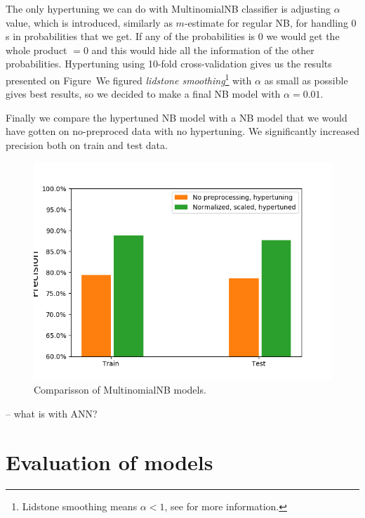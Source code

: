 \documentclass[11pt,a4paper]{article}
\begin{document}
%
The only hypertuning we can do with MultinomialNB classifier is adjusting $\alpha$ value, which is introduced, similarly as $m$-estimate for regular NB, for handling $0$s in probabilities that we get. If any of the probabilities is $0$ we would get the whole product $=0$ and this would hide all the information of the other probabilities. 
Hypertuning using 10-fold cross-validation gives us the results presented on Figure~We figured {\em lidstone smoothing}\footnote{Lidstone smoothing means $\alpha <1$, see \cite[1.9.]{scikit} for more information.} with $\alpha$ as small as possible gives best results, so we decided to make a final NB model with $\alpha = 0.01$. 

Finally we compare the hypertuned NB model with a NB model that we would have gotten on no-preproced data with no hypertuning. We significantly increased precision both on train and test data.
\begin{figure}[ht!]
\centering
\includegraphics[scale=0.60]{mNB_model_comparison_precision.png}
\caption{Comparisson of MultinomialNB models.}
\label{fig:mNB_model_comparison_precision}
\end{figure}



\newpage
\noindent
{}

\smallskip

-- what is with ANN?

\section{Evaluation of models}
\label{sec-evaluation}
\end{document}
